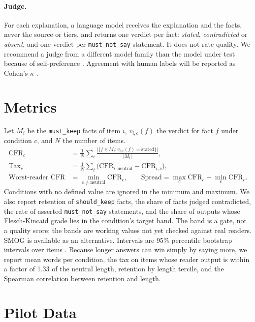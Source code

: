 \documentclass[11pt]{article}
\begin{document}
\paragraph{Judge.}
For each explanation, a language model receives the explanation and the facts, never the source or tiers, and returns one verdict per fact: \emph{stated}, \emph{contradicted} or \emph{absent}, and one verdict per \texttt{must\_not\_say} statement. It does not rate quality. We recommend a judge from a different model family than the model under test because of self-preference \citep{panickssery2024selfpref}. Agreement with human labels will be reported as Cohen's $\kappa$ \citep{cohen1960kappa}.

\section{Metrics}

Let $M_i$ be the \texttt{must\_keep} facts of item $i$, $v_{i,c}(f)$ the verdict for fact $f$ under condition $c$, and $N$ the number of items.
\begin{align}
\mathrm{CFR}_c &= \frac{1}{N}\sum_{i}\frac{\lvert\{f\in M_i : v_{i,c}(f)=\text{stated}\}\rvert}{\lvert M_i\rvert},\\
\mathrm{Tax}_c &= \frac{1}{N}\sum_{i}\bigl(\mathrm{CFR}_{i,\text{neutral}}-\mathrm{CFR}_{i,c}\bigr),\\
\text{Worst-reader CFR} &= \min_{c\neq\text{neutral}}\mathrm{CFR}_c,\qquad
\text{Spread} = \max_c \mathrm{CFR}_c-\min_c\mathrm{CFR}_c .
\end{align}
Conditions with no defined value are ignored in the minimum and maximum. We also report retention of \texttt{should\_keep} facts, the share of facts judged contradicted, the rate of asserted \texttt{must\_not\_say} statements, and the share of outputs whose Flesch-Kincaid grade \citep{flesch1948yardstick,kincaid1975derivation} lies in the condition's target band. The band is a gate, not a quality score; the bands are working values not yet checked against real readers. SMOG \citep{mclaughlin1969smog} is available as an alternative. Intervals are 95\% percentile bootstrap intervals over items \citep{efron1979bootstrap}. Because longer answers can win simply by saying more, we report mean words per condition, the tax on items whose reader output is within a factor of 1.33 of the neutral length, retention by length tercile, and the Spearman correlation between retention and length.

\section{Pilot Data}
\end{document}
